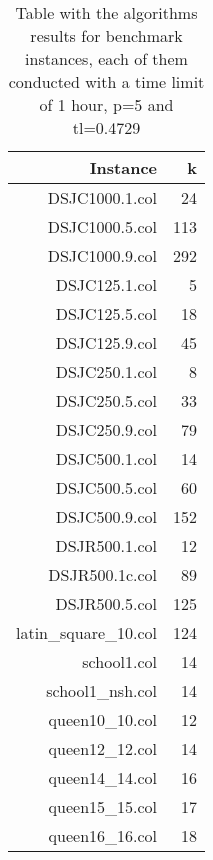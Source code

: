 \documentclass[a4paper]{scrartcl}
\begin{document}
\begin{table}
  \small
    \begin{adjustwidth}{-.5in}{-.5in}  
        \begin{center}
          \begin{tabular}{r | r  }
                      
            \hline
Instance & k   \\
\hline \hline 
DSJC1000.1.col &  24   \\
DSJC1000.5.col & 113 \\
DSJC1000.9.col & 292 \\
DSJC125.1.col & 5   \\
DSJC125.5.col & 18  \\
DSJC125.9.col & 45  \\
DSJC250.1.col & 8 \\
DSJC250.5.col & 33  \\
DSJC250.9.col & 79  \\
DSJC500.1.col & 14  \\
DSJC500.5.col & 60  \\
DSJC500.9.col & 152  \\
DSJR500.1.col & 12  \\
DSJR500.1c.col & 89 \\
DSJR500.5.col & 125  \\
latin\_square\_10.col & 124 \\
school1.col & 14  \\
school1\_nsh.col & 14 \\
queen10\_10.col & 12  \\
queen12\_12.col & 14  \\
queen14\_14.col & 16  \\
queen15\_15.col & 17  \\
queen16\_16.col & 18  \\

\hline
\end{tabular}
        \caption{Table with the algorithms results for benchmark instances, each of them conducted with a time limit of 1 hour, p=5 and tl=0.4729 }
        \label{myTable1}
        \end{center}
    \end{adjustwidth}
\end{table}







\end{document}
